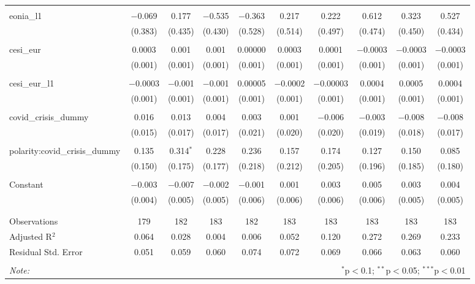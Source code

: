 \begin{table}[!htbp]
\begin{adjustbox}{width=1.25\textwidth}
\begin{tabular}{@{\extracolsep{5pt}}lccccccccc}
  & & & & & & & & & \\ 
 eonia\_l1 & $-$0.069 & 0.177 & $-$0.535 & $-$0.363 & 0.217 & 0.222 & 0.612 & 0.323 & 0.527 \\ 
  & (0.383) & (0.435) & (0.430) & (0.528) & (0.514) & (0.497) & (0.474) & (0.450) & (0.434) \\ 
  & & & & & & & & & \\ 
 cesi\_eur & 0.0003 & 0.001 & 0.001 & 0.00000 & 0.0003 & 0.0001 & $-$0.0003 & $-$0.0003 & $-$0.0003 \\ 
  & (0.001) & (0.001) & (0.001) & (0.001) & (0.001) & (0.001) & (0.001) & (0.001) & (0.001) \\ 
  & & & & & & & & & \\ 
 cesi\_eur\_l1 & $-$0.0003 & $-$0.001 & $-$0.001 & 0.00005 & $-$0.0002 & $-$0.00003 & 0.0004 & 0.0005 & 0.0004 \\ 
  & (0.001) & (0.001) & (0.001) & (0.001) & (0.001) & (0.001) & (0.001) & (0.001) & (0.001) \\ 
  & & & & & & & & & \\ 
 covid\_crisis\_dummy & 0.016 & 0.013 & 0.004 & 0.003 & 0.001 & $-$0.006 & $-$0.003 & $-$0.008 & $-$0.008 \\ 
  & (0.015) & (0.017) & (0.017) & (0.021) & (0.020) & (0.020) & (0.019) & (0.018) & (0.017) \\ 
  & & & & & & & & & \\ 
 polarity:covid\_crisis\_dummy & 0.135 & 0.314$^{*}$ & 0.228 & 0.236 & 0.157 & 0.174 & 0.127 & 0.150 & 0.085 \\ 
  & (0.150) & (0.175) & (0.177) & (0.218) & (0.212) & (0.205) & (0.196) & (0.185) & (0.180) \\ 
  & & & & & & & & & \\ 
 Constant & $-$0.003 & $-$0.007 & $-$0.002 & $-$0.001 & 0.001 & 0.003 & 0.005 & 0.003 & 0.004 \\ 
  & (0.004) & (0.005) & (0.005) & (0.006) & (0.006) & (0.006) & (0.006) & (0.005) & (0.005) \\ 
  & & & & & & & & & \\ 
\hline \\[-1.8ex] 
Observations & 179 & 182 & 183 & 182 & 183 & 183 & 183 & 183 & 183 \\ 
Adjusted R$^{2}$ & 0.064 & 0.028 & 0.004 & 0.006 & 0.052 & 0.120 & 0.272 & 0.269 & 0.233 \\ 
Residual Std. Error & 0.051 & 0.059 & 0.060 & 0.074 & 0.072 & 0.069 & 0.066 & 0.063 & 0.060 \\ 
\hline 
\hline \\[-1.8ex] 
\textit{Note:}  & \multicolumn{9}{r}{$^{*}$p$<$0.1; $^{**}$p$<$0.05; $^{***}$p$<$0.01} \\ 
\end{tabular} 
\end{adjustbox} 
\end{table} 

